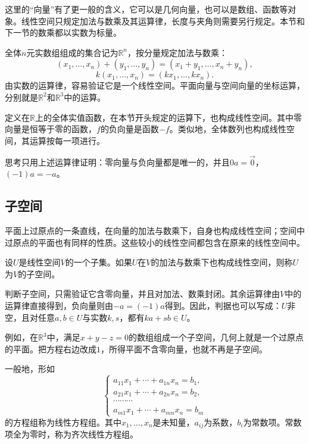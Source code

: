 这里的“向量”有了更一般的含义，它可以是几何向量，也可以是数组、函数等对象。线性空间只规定加法与数乘及其运算律，长度与夹角则需要另行规定。本节和下一节的数乘都以实数为标量。

全体\(n\)元实数组组成的集合记为\(\mathbb{R}^{n}\)，按分量规定加法与数乘：
\begin{equation}
    \left( x_{1} , \ldots , x_{n} \right) + \left( y_{1} , \ldots , y_{n} \right) = \left( x_{1} + y_{1} , \ldots , x_{n} + y_{n} \right) ,
\end{equation}
\begin{equation}
    k \left( x_{1} , \ldots , x_{n} \right) = \left( k x_{1} , \ldots , k x_{n} \right) .
\end{equation}
由实数的运算律，容易验证它是一个线性空间。平面向量与空间向量的坐标运算，分别就是\(\mathbb{R}^{2}\)和\(\mathbb{R}^{3}\)中的运算。

定义在\(\mathbb{R}\)上的全体实值函数，在本节开头规定的运算下，也构成线性空间。其中零向量是恒等于零的函数，\(f\)的负向量是函数\(- f\)。类似地，全体数列也构成线性空间，其运算按每一项进行。

{\kaiti{}思考\quad 只用上述运算律证明：零向量与负向量都是唯一的，并且\(0 a = \vec{0}\)，\(\left( - 1 \right) a = - a\)。}

\subsection{子空间}
平面上过原点的一条直线，在向量的加法与数乘下，自身也构成线性空间；空间中过原点的平面也有同样的性质。这些较小的线性空间都包含在原来的线性空间中。

\begin{definition}\label{def:subspace}
设\(U\)是线性空间\(V\)的一个子集。如果\(U\)在\(V\)的加法与数乘下也构成线性空间，则称\(U\)为\(V\)的子空间。
\end{definition}

判断子空间，只需验证它含零向量，并且对加法、数乘封闭。其余运算律由\(V\)中的运算律直接得到，负向量则由\(- a = \left( - 1 \right) a\)得到。因此，判据也可以写成：\(U\)非空，且对任意\(a , b \in U\)与实数\(k , s\)，都有\(k a + s b \in U\)。

例如，在\(\mathbb{R}^{3}\)中，满足\(x + y - z = 0\)的数组组成一个子空间，几何上就是一个过原点的平面。把方程右边改成\(1\)，所得平面不含零向量，也就不再是子空间。

一般地，形如
\begin{equation}
    \left\{ \begin{matrix}
        a_{11} x_{1} + \cdots + a_{1 n} x_{n} = b_{1} , \\
        a_{21} x_{1} + \cdots + a_{2 n} x_{n} = b_{2} , \\
        \cdots \cdots \cdots \\
        a_{m 1} x_{1} + \cdots + a_{m n} x_{n} = b_{m}
    \end{matrix} \right.
\end{equation}
的方程组称为{\heiti{}线性方程组}。其中\(x_{1} , \ldots , x_{n}\)是未知量，\(a_{i j}\)为系数，\(b_{i}\)为常数项。常数项全为零时，称为{\heiti{}齐次线性方程组}。

